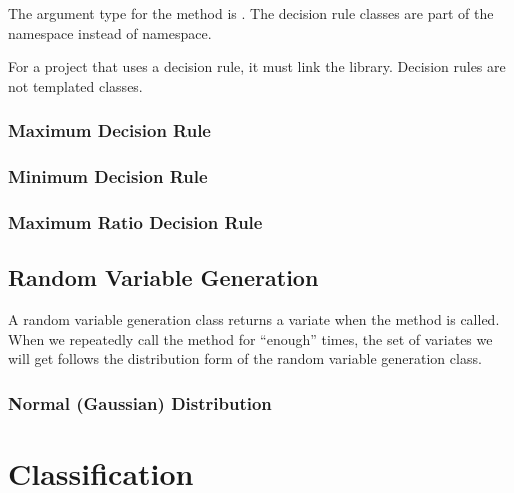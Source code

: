 The argument type for the  method is
. The decision rule classes are part of the
 namespace instead of  namespace.

For a project that uses a decision rule, it must link the 
library. Decision rules are not templated classes.

\subsubsection{Maximum Decision Rule}
\label{sec:MaximumDecisionRule}

\ifitkFullVersion 

\fi

\subsubsection{Minimum Decision Rule}
\label{sec:MinimumDecisionRule}

\ifitkFullVersion 

\fi

\subsubsection{Maximum Ratio Decision Rule}
\label{sec:MaximumRatioDecisionRule}



\subsection{Random Variable Generation}
\label{sec:RandomVariableGeneration}

A random variable generation class returns a variate when the
 method is called. When we repeatedly call the method
for ``enough'' times, the set of variates we will get follows
the distribution form of the random variable generation class.
 
\subsubsection{Normal (Gaussian) Distribution}
\label{sec:NormalVariateGeneration}

\ifitkFullVersion 

\fi

\section{Classification}
\label{sec:Classification}

